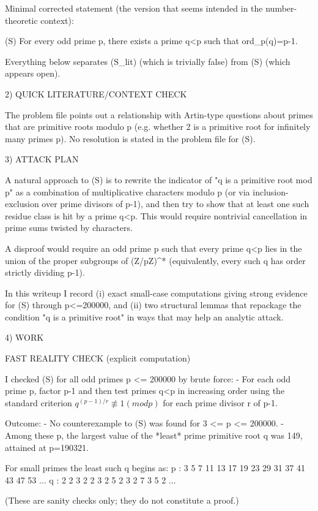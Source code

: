 Minimal corrected statement (the version that seems intended in the number-theoretic context):

  (S)  For every odd prime p, there exists a prime q<p such that ord_p(q)=p-1.

Everything below separates (S_lit) (which is trivially false) from (S) (which appears open).

2) QUICK LITERATURE/CONTEXT CHECK

The problem file points out a relationship with Artin-type questions about primes that are
primitive roots modulo p (e.g. whether 2 is a primitive root for infinitely many primes p).
No resolution is stated in the problem file for (S).

3) ATTACK PLAN

A natural approach to (S) is to rewrite the indicator of "q is a primitive root mod p" as a
combination of multiplicative characters modulo p (or via inclusion-exclusion over prime
divisors of p-1), and then try to show that at least one such residue class is hit by a prime
q<p. This would require nontrivial cancellation in prime sums twisted by characters.

A disproof would require an odd prime p such that every prime q<p lies in the union of the
proper subgroups of (Z/pZ)^* (equivalently, every such q has order strictly dividing p-1).

In this writeup I record (i) exact small-case computations giving strong evidence for (S)
through p<=200000, and (ii) two structural lemmas that repackage the condition "q is a
primitive root" in ways that may help an analytic attack.

4) WORK

FAST REALITY CHECK (explicit computation)

I checked (S) for all odd primes p <= 200000 by brute force:
- For each odd prime p, factor p-1 and then test primes q<p in increasing order using the
  standard criterion \(q^{(p-1)/r} \not\equiv 1 (mod p)\) for each prime divisor r of p-1.

Outcome:
- No counterexample to (S) was found for 3 <= p <= 200000.
- Among these p, the largest value of the *least* prime primitive root q was 149, attained at
  p=190321.

For small primes the least such q begins as:
  p :  3  5  7 11 13 17 19 23 29 31 37 41 43 47 53 ...
  q :  2  2  3  2  2  3  2  5  2  3  2  7  3  5  2 ...

(These are sanity checks only; they do not constitute a proof.)

